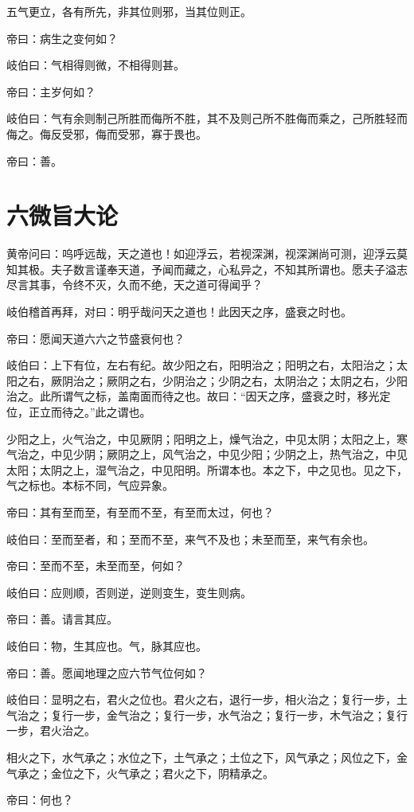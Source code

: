 \documentclass{article}%
\begin{document}
五气更立，各有所先，非其位则邪，当其位则正。

帝曰：病生之变何如？

岐伯曰：气相得则微，不相得则甚。

帝曰：主岁何如？

岐伯曰：气有余则制己所胜而侮所不胜，其不及则己所不胜侮而乘之，己所胜轻而侮之。侮反受邪，侮而受邪，寡于畏也。

帝曰：善。
\section{六微旨大论}
黄帝问曰：呜呼远哉，天之道也！如迎浮云，若视深渊，视深渊尚可测，迎浮云莫知其极。夫子数言谨奉天道，予闻而藏之，心私异之，不知其所谓也。愿夫子溢志尽言其事，令终不灭，久而不绝，天之道可得闻乎？

岐伯稽首再拜，对曰：明乎哉问天之道也！此因天之序，盛衰之时也。

帝曰：愿闻天道六六之节盛衰何也？

岐伯曰：上下有位，左右有纪。故少阳之右，阳明治之；阳明之右，太阳治之；太阳之右，厥阴治之；厥阴之右，少阴治之；少阴之右，太阴治之；太阴之右，少阳治之。此所谓气之标，盖南面而待之也。故曰：“因天之序，盛衰之时，移光定位，正立而待之。”此之谓也。

少阳之上，火气治之，中见厥阴；阳明之上，燥气治之，中见太阴；太阳之上，寒气治之，中见少阴；厥阴之上，风气治之，中见少阳；少阴之上，热气治之，中见太阳；太阴之上，湿气治之，中见阳明。所谓本也。本之下，中之见也。见之下，气之标也。本标不同，气应异象。

帝曰：其有至而至，有至而不至，有至而太过，何也？

岐伯曰：至而至者，和；至而不至，来气不及也；未至而至，来气有余也。

帝曰：至而不至，未至而至，何如？

岐伯曰：应则顺，否则逆，逆则变生，变生则病。

帝曰：善。请言其应。

岐伯曰：物，生其应也。气，脉其应也。

帝曰：善。愿闻地理之应六节气位何如？

岐伯曰：显明之右，君火之位也。君火之右，退行一步，相火治之；复行一步，土气治之；复行一步，金气治之；复行一步，水气治之；复行一步，木气治之；复行一步，君火治之。

相火之下，水气承之；水位之下，土气承之；土位之下，风气承之；风位之下，金气承之；金位之下，火气承之；君火之下，阴精承之。

帝曰：何也？
\end{document}
